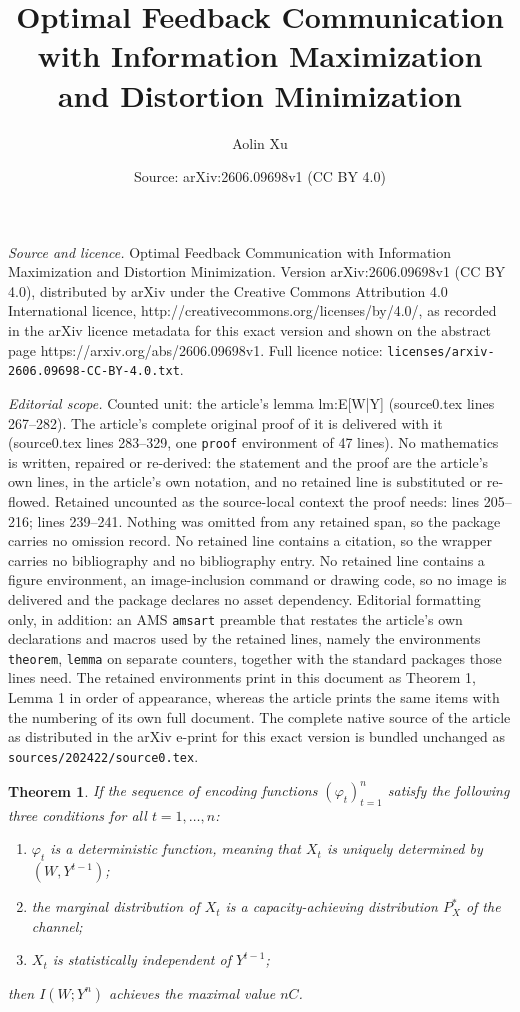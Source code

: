 \documentclass[10pt,a4paper]{amsart}
\title{Optimal Feedback Communication with Information Maximization and Distortion Minimization}
\author{Aolin Xu}
\date{Source: arXiv:2606.09698v1 (CC BY 4.0)}
\newtheorem{theorem}{Theorem}
\begin{document}
\maketitle

\noindent\emph{Source and licence.} Optimal Feedback Communication with Information Maximization and Distortion Minimization. Version arXiv:2606.09698v1 (CC BY 4.0), distributed by arXiv under the Creative Commons Attribution 4.0 International licence, http://creativecommons.org/licenses/by/4.0/, as recorded in the arXiv licence metadata for this exact version and shown on the abstract page https://arxiv.org/abs/2606.09698v1. Full licence notice: \texttt{licenses/arxiv-2606.09698-CC-BY-4.0.txt}.\par\smallskip

\noindent\textit{Editorial scope.} Counted unit: the article's lemma lm:E[W|Y] (source0.tex lines 267--282). The article's complete original proof of it is delivered with it (source0.tex lines 283--329, one \texttt{proof} environment of 47 lines). No mathematics is written, repaired or re-derived: the statement and the proof are the article's own lines, in the article's own notation, and no retained line is substituted or re-flowed.  Retained uncounted as the source-local context the proof needs: lines 205--216; lines 239--241.  Nothing was omitted from any retained span, so the package carries no omission record.  No retained line contains a citation, so the wrapper carries no bibliography and no bibliography entry.  No retained line contains a figure environment, an image-inclusion command or drawing code, so no image is delivered and the package declares no asset dependency.  Editorial formatting only, in addition: an AMS \texttt{amsart} preamble that restates the article's own declarations and macros used by the retained lines, namely the environments \texttt{theorem}, \texttt{lemma} on separate counters, together with the standard packages those lines need.  The retained environments print in this document as Theorem 1, Lemma 1 in order of appearance, whereas the article prints the same items with the numbering of its own full document.  The complete native source of the article as distributed in the arXiv e-print for this exact version is bundled unchanged as \texttt{sources/202422/source0.tex}.
\begin{theorem}\label{th:suff_info_max}
If the sequence of encoding functions $(\varphi_t)_{t=1}^n$ satisfy the following three conditions for all $t=1,\ldots,n$: 
\begin{enumerate}[leftmargin=*]
    \item 
    $\varphi_t$ is a deterministic function, meaning that $X_t$ is uniquely determined by $(W, Y^{t-1})$;
    \item 
    the marginal distribution of $X_t$ is a capacity-achieving distribution $P_X^*$ of the channel;
    \item 
    $X_t$ is statistically independent of $Y^{t-1}$;
\end{enumerate}
then $I(W;Y^n)$ achieves the maximal value $nC$.
\end{theorem}
\end{document}
